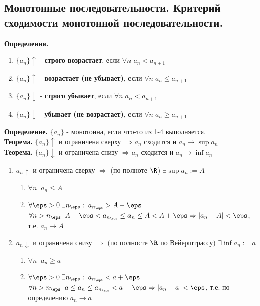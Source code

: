 \subsection{Монотонные последовательности. Критерий сходимости монотонной последовательности.}

\textbf{Определения.}
\begin{enumerate}
	\item $\{a_n\} \uparrow$ - \textbf{строго возрастает}, если $\forall n\; a_n < a_{n + 1}$
	\item $\{a_n\} \uparrow$ - \textbf{возрастает (не убывает)}, если $\forall n\; a_n \leq a_{n + 1}$
	\item $\{a_n\}\downarrow$ - \textbf{строго убывает}, если $\forall n\; a_n < a_{n + 1}$
	\item $\{a_n\}\downarrow$ - \textbf{убывает (не возрастает)}, если $\forall n\; a_n \geq a_{n + 1}$
\end{enumerate}
\textbf{Определение.} $\{a_n\}$ - монотонна, если что-то из 1-4 выполняется.\\
\textbf{Теорема.} $\{a_n\} \uparrow$ и ограничена сверху $\Rightarrow a_n$ сходится и $a_n \to \sup a_n$\\
\textbf{Теорема.} $\{a_n\} \downarrow$ и ограничена снизу $\Rightarrow a_n$ сходится и $a_n \to \inf a_n$
\begin{tcolorbox}[title=Доказательство]
	\begin{enumerate}
		\item $a_n \uparrow$ и ограничена сверху $\Rightarrow$ (по полноте $\R$) $\exists \sup a_n := A$
    \begin{enumerate}
        \item $\forall n\;\; a_n \leq A$
        \item $\forall \eps > 0\; \exists n_\eps:\; a_{n_\eps} > A - \eps$\\
            $\forall n > n_\eps\;\; A - \eps < a_{n_\eps} \leq a_n \leq A < A + \eps \Rightarrow |a_n - A| < \eps$, т.е. $a_n \to A$
    \end{enumerate}
		\item $a_n \downarrow$ и ограничена снизу $\Rightarrow$ (по полносте $\R$ по Вейерштрассу) $\exists \inf a_n := a$
			\begin{enumerate}
				\item $\forall n\;\; a_n \geq a$
				\item $\forall \eps > 0\; \exists n_\eps:\; a_{n_\eps} < a + \eps$\\
					$\forall n > n_\eps\;\; a \leq a_n \leq a_{n_\eps} < a + \eps \Rightarrow |a_n - a| < \eps$, т.е. по определению $a_n \to a$
			\end{enumerate}
	\end{enumerate}
\end{tcolorbox}

